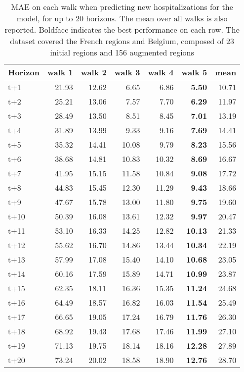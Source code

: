 \begin{table}[H]
\centering
\caption{MAE on each walk when predicting new hospitalizations for the model, for up to 20 horizons. The mean over all walks is also reported. Boldface indicates the best performance on each row. The dataset covered the French regions and Belgium, composed of 23 initial regions and 156 augmented regions }
\label{tab:MAE_walk_custom_linear_regression}
\begin{tabular}{lrrrrrr}
\toprule
Horizon &  walk 1 &  walk 2 &  walk 3 &  walk 4 &  walk 5 &  mean \\
\midrule
t+1  & 21.93  & 12.62  & 6.65  & 6.86  & \textbf{5.50}  & 10.71  \\
t+2  & 25.21  & 13.06  & 7.57  & 7.70  & \textbf{6.29}  & 11.97  \\
t+3  & 28.49  & 13.50  & 8.51  & 8.45  & \textbf{7.01}  & 13.19  \\
t+4  & 31.89  & 13.99  & 9.33  & 9.16  & \textbf{7.69}  & 14.41  \\
t+5  & 35.32  & 14.41  & 10.08  & 9.79  & \textbf{8.23}  & 15.56  \\
t+6  & 38.68  & 14.81  & 10.83  & 10.32  & \textbf{8.69}  & 16.67  \\
t+7  & 41.95  & 15.15  & 11.58  & 10.84  & \textbf{9.08}  & 17.72  \\
t+8  & 44.83  & 15.45  & 12.30  & 11.29  & \textbf{9.43}  & 18.66  \\
t+9  & 47.67  & 15.78  & 13.00  & 11.80  & \textbf{9.75}  & 19.60  \\
t+10  & 50.39  & 16.08  & 13.61  & 12.32  & \textbf{9.97}  & 20.47  \\
t+11  & 53.10  & 16.33  & 14.25  & 12.82  & \textbf{10.13}  & 21.33  \\
t+12  & 55.62  & 16.70  & 14.86  & 13.44  & \textbf{10.34}  & 22.19  \\
t+13  & 57.99  & 17.08  & 15.40  & 14.10  & \textbf{10.68}  & 23.05  \\
t+14  & 60.16  & 17.59  & 15.89  & 14.71  & \textbf{10.99}  & 23.87  \\
t+15  & 62.35  & 18.11  & 16.36  & 15.35  & \textbf{11.24}  & 24.68  \\
t+16  & 64.49  & 18.57  & 16.82  & 16.03  & \textbf{11.54}  & 25.49  \\
t+17  & 66.65  & 19.05  & 17.24  & 16.79  & \textbf{11.76}  & 26.30  \\
t+18  & 68.92  & 19.43  & 17.68  & 17.46  & \textbf{11.99}  & 27.10  \\
t+19  & 71.13  & 19.75  & 18.14  & 18.16  & \textbf{12.28}  & 27.89  \\
t+20  & 73.24  & 20.02  & 18.58  & 18.90  & \textbf{12.76}  & 28.70  \\

\bottomrule
\end{tabular}
\end{table}
